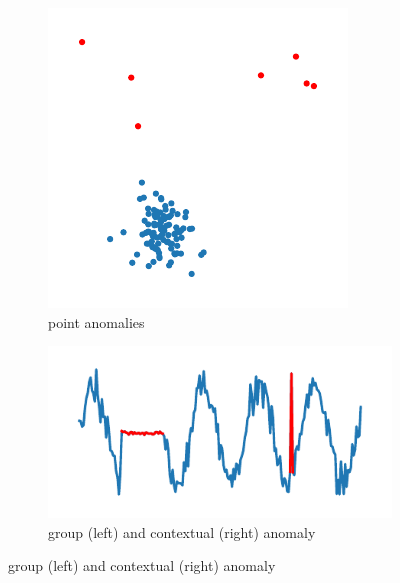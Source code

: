 \begin{figure}
\centering
\begin{subfigure}[b]{0.35\textwidth}
         \centering
         \includegraphics[width=\textwidth]{data/chapter_intro/point_anomalies.pdf}
         \caption{point anomalies}
         \label{fig:point_anomaly}
     \end{subfigure}
     \hfill
     \begin{subfigure}[b]{0.55\textwidth}
         \centering
         \includegraphics[width=\textwidth]{data/chapter_intro/group_anomalies.pdf}
         \caption{group (left) and contextual (right) anomaly}
         \label{fig:group_anomaly}
     \end{subfigure}


\end{figure}
